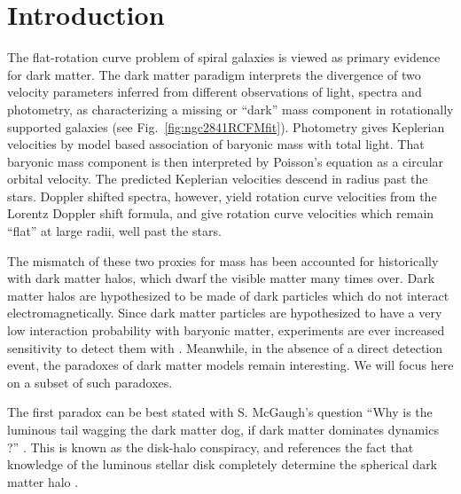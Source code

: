 \documentclass[reprint,%
 amsmath,amssymb,
 aps,
]{revtex4-1}
\begin{document}
\section{Introduction  \label{sec:uno}}



 The flat-rotation curve problem of spiral galaxies  is viewed as primary evidence for dark matter\cite{Rub,Bosma,1985ApJAlbada}. 
 The dark matter paradigm interprets the divergence of two velocity parameters inferred from  different    observations of light, spectra and photometry, 
     as characterizing a missing or ``dark'' mass component in rotationally supported galaxies (see Fig.~\ref{fig:ngc2841RCFMfit}). 
 Photometry gives Keplerian velocities by  model based  association of baryonic mass with total light. That baryonic mass component is then interpreted by Poisson's equation as a circular orbital velocity. The predicted Keplerian  velocities   descend in radius past the stars. 
 Doppler shifted spectra, however,  yield rotation curve velocities  from  the Lorentz Doppler shift formula, and give rotation curve velocities which remain ``flat''  at large radii, well past the stars. 
 
 The mismatch of these two proxies for mass has been  accounted for historically with dark matter halos,  which dwarf the visible matter many times over. Dark matter halos    are hypothesized to be made of  dark particles which do not interact   electromagnetically. Since
 dark matter particles are hypothesized to  have a very low interaction probability with baryonic matter,    experiments are ever increased  sensitivity    to detect them with  \cite{Cebrian:2022brv}. Meanwhile,  in the absence of a direct detection event,  the paradoxes of dark matter models remain    interesting. We will focus here on a subset of such paradoxes. 
 
   
   The first paradox can  be best stated with
  S. McGaugh's question   ``Why is the luminous tail wagging the dark matter dog,  if dark matter dominates dynamics ?'' \cite{1999McGaugh,McGaugh2016RAR}. This is known as the  disk-halo conspiracy, and references the   fact that knowledge  of 
 the luminous stellar   disk  completely determine the spherical dark matter halo \cite{2004ApJ...609..652M}. 
 
\end{document}

